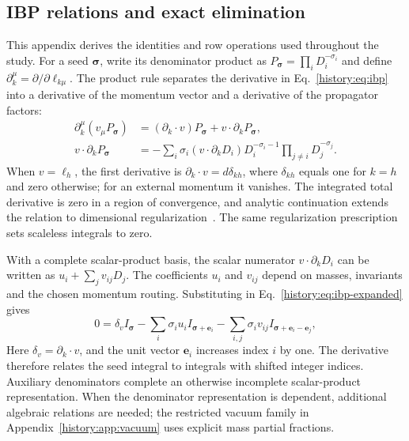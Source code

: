 \subsection{IBP relations and exact elimination}
\label{history:app:ibp}
This appendix derives the identities and row operations used throughout the study. For a seed $\boldsymbol\sigma$, write its denominator product as $P_{\boldsymbol\sigma}=\prod_iD_i^{-\sigma_i}$ and define $\partial_k^\mu=\partial/\partial\ell_{k\mu}$. The product rule separates the derivative in Eq.~\eqref{history:eq:ibp} into a derivative of the momentum vector and a derivative of the propagator factors:
\begin{align}
 \partial_k^\mu(v_\mu P_{\boldsymbol\sigma})
 &= (\partial_k\cdot v)P_{\boldsymbol\sigma}
       +v\cdot\partial_k P_{\boldsymbol\sigma},\\
 v\cdot\partial_k P_{\boldsymbol\sigma}
 &=-\sum_i\sigma_i(v\cdot\partial_kD_i)
       D_i^{-\sigma_i-1}\prod_{j\ne i}D_j^{-\sigma_j}.
 \label{history:eq:ibp-expanded}
\end{align}
When $v=\ell_h$, the first derivative is $\partial_k\cdot v=d\delta_{kh}$, where $\delta_{kh}$ equals one for $k=h$ and zero otherwise; for an external momentum it vanishes. The integrated total derivative is zero in a region of convergence, and analytic continuation extends the relation to dimensional regularization~\cite{ChetyrkinTkachov,Weinzierl2022}. The same regularization prescription sets scaleless integrals to zero.

With a complete scalar-product basis, the scalar numerator $v\cdot\partial_kD_i$ can be written as $u_i+\sum_j v_{ij}D_j$. The coefficients $u_i$ and $v_{ij}$ depend on masses, invariants and the chosen momentum routing. Substituting in Eq.~\eqref{history:eq:ibp-expanded} gives
\begin{equation}
 0=\delta_v I_{\boldsymbol\sigma}
 -\sum_i\sigma_i u_i I_{\boldsymbol\sigma+\boldsymbol e_i}
 -\sum_{i,j}\sigma_i v_{ij}
       I_{\boldsymbol\sigma+\boldsymbol e_i-\boldsymbol e_j},
 \label{history:eq:ibp-shifts}
\end{equation}
Here $\delta_v=\partial_k\cdot v$, and the unit vector $\boldsymbol e_i$ increases index $i$ by one. The derivative therefore relates the seed integral to integrals with shifted integer indices. Auxiliary denominators complete an otherwise incomplete scalar-product representation. When the denominator representation is dependent, additional algebraic relations are needed; the restricted vacuum family in Appendix~\ref{history:app:vacuum} uses explicit mass partial fractions.

